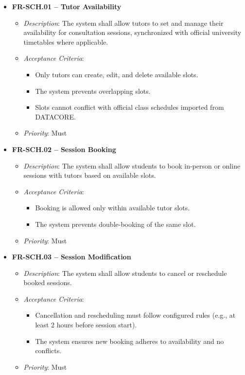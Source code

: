 \begin{itemize}
\item \textbf{FR-SCH.01 – Tutor Availability}
\begin{itemize}
\item \textit{Description}: The system shall allow tutors to set and manage their availability for consultation sessions, synchronized with official university timetables where applicable.
\item \textit{Acceptance Criteria}:
\begin{itemize}
\item Only tutors can create, edit, and delete available slots.
\item The system prevents overlapping slots.
\item Slots cannot conflict with official class schedules imported from DATACORE.
\end{itemize}
\item \textit{Priority}: Must
\end{itemize}


\item \textbf{FR-SCH.02 – Session Booking}
    \begin{itemize}
        \item \textit{Description}: The system shall allow students to book in-person or online sessions with tutors based on available slots.
        \item \textit{Acceptance Criteria}:
            \begin{itemize}
                \item Booking is allowed only within available tutor slots.
                \item The system prevents double-booking of the same slot.
            \end{itemize}  
        \item \textit{Priority}: Must
    \end{itemize}
    
\item \textbf{FR-SCH.03 – Session Modification}
    \begin{itemize}
        \item \textit{Description}: The system shall allow students to cancel or reschedule booked sessions.
        \item \textit{Acceptance Criteria}:
            \begin{itemize}
                \item Cancellation and rescheduling must follow configured rules (e.g., at least 2 hours before session start).
                \item The system ensures new booking adheres to availability and no conflicts.
            \end{itemize}  
        \item \textit{Priority}: Must
    \end{itemize}
    

\end{itemize}
